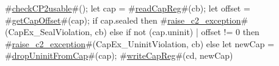    #\hyperref[zcheckCP2usable]{checkCP2usable}#();
   let cap  = #\hyperref[zreadCapReg]{readCapReg}#(cb);
   let offset = #\hyperref[zgetCapOffset]{getCapOffset}#(cap);
   if cap.sealed then
    #\hyperref[zraisezyc2zyexception]{raise\_c2\_exception}#(CapEx_SealViolation, cb)
   else if not (cap.uninit) | offset != 0 then
    #\hyperref[zraisezyc2zyexception]{raise\_c2\_exception}#(CapEx_UninitViolation, cb)
   else
   {
    let newCap = #\hyperref[zdropUninitFromCap]{dropUninitFromCap}#(cap);
    #\hyperref[zwriteCapReg]{writeCapReg}#(cd, newCap)
   }
